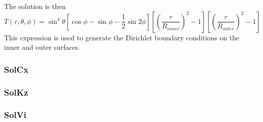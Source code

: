 The solution is then 
\[
T(r,\theta,\phi) = \sin^4 \theta \left[ \cos\phi -\sin\phi -\frac12 \sin 2\phi \right]
\left[ \left(\frac{r}{R_{inner}}\right)^2 -1  \right]
\left[ \left(\frac{r}{R_{outer}}\right)^2 -1  \right]
\]
This expression is used to generate the Dirichlet boundary conditions on the inner and outer surfaces.


\subsubsection{SolCx} 



\subsubsection{SolKz} 



\subsubsection{SolVi} 













